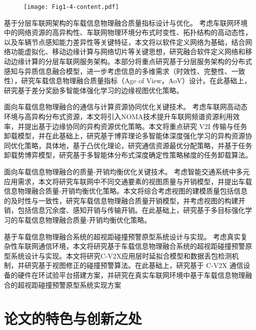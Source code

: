 \begin{figure}[h] 
	\centering
	\texttt{[image: Fig1-4-content.pdf]}
	\label{fig 1-4}
\end{figure}

 基于分层车联网架构的车载信息物理融合质量指标设计与优化。
考虑车联网环境中的网络资源的高异构性、车联网物理环境分布式时变性、拓扑结构的高动态性，以及车辆节点感知能力差异性等关键特征，本文将以软件定义网络为基础，结合网络功能虚拟化、移动边缘计算与网络切片等关键思想，研究融合软件定义网络和移动边缘计算的分层车联网服务架构。本部分将重点研究基于分层服务架构的分布式感知与异质信息融合模型，进一步考虑信息的多维需求（时效性、完整性、一致性），研究车载信息物理融合质量指标（Age of View，AoV）设计。在此基础上，研究基于差分奖励多智能体强化学习的边缘视图优化策略。

 面向车载信息物理融合的通信与计算资源协同优化关键技术。
考虑车联网高动态环境与高异构分布式资源，本文将引入NOMA技术提升车联网频谱资源利用效率，并提出基于边缘协同的异构资源优化策略。本文将重点研究 V2I 传输与任务卸载模型，并在此基础上，研究基于博弈理论多智能体深度强化学习的异构资源协同优化策略，具体地，基于凸优化理论，研究通信资源最优分配策略，并基于任务卸载势博弈模型，研究基于多智能体分布式深度确定性策略梯度的任务卸载算法。

 面向车载信息物理融合的质量-开销均衡优化关键技术。
考虑智能交通系统中多元应用需求，本文将研究车联网中不同交通要素的视图质量与开销模型，并提出车载信息物理融合质量-开销均衡优化策略。本文将综合考虑视图的建模质量包括信息的及时性与一致性，研究车载信息物理融合质量开销模型，并考虑视图的构建开销，包括信息冗余度、感知开销与传输开销。在此基础上，研究基于多目标强化学习的车载信息物理融合质量-开销均衡优化策略。

 基于车载信息物理融合系统的超视距碰撞预警原型系统设计与实现。
考虑真实复杂性车联网通信环境，本文将研究基于车载信息物理融合系统的超视距碰撞预警原型系统设计与实现。本文将研究C-V2X应用层时延拟合模型和数据丢包检测机制，并研究基于视图修正的碰撞预警算法。在此基础上，研究基于 C-V2X 通信设备的硬件在环试验平台搭建方案，并研究在真实车联网环境中基于车载信息物理融合的超视距碰撞预警原型系统实现方案

\section{论文的特色与创新之处}\label{section 1-6}

